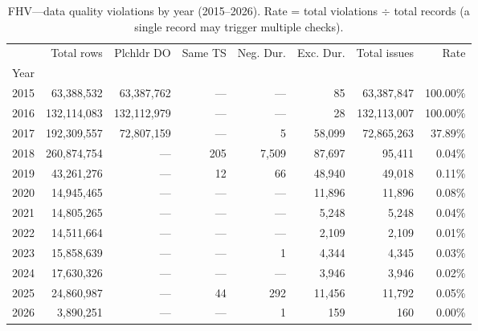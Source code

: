 \begin{table}
\caption{FHV---data quality violations by year (2015--2026). Rate = total violations $\div$ total records (a single record may trigger multiple checks).}
\label{tab:t2_fhv_tripdata}
\begin{tabular}{rrrrrrrr}
\toprule
 & Total rows & Plchldr DO & Same TS & Neg. Dur. & Exc. Dur. & Total issues & Rate \\
Year &  &  &  &  &  &  &  \\
\midrule
2015 & 63,388,532 & 63,387,762 & --- & --- & 85 & 63,387,847 & 100.00\% \\
2016 & 132,114,083 & 132,112,979 & --- & --- & 28 & 132,113,007 & 100.00\% \\
2017 & 192,309,557 & 72,807,159 & --- & 5 & 58,099 & 72,865,263 & 37.89\% \\
2018 & 260,874,754 & --- & 205 & 7,509 & 87,697 & 95,411 & 0.04\% \\
2019 & 43,261,276 & --- & 12 & 66 & 48,940 & 49,018 & 0.11\% \\
2020 & 14,945,465 & --- & --- & --- & 11,896 & 11,896 & 0.08\% \\
2021 & 14,805,265 & --- & --- & --- & 5,248 & 5,248 & 0.04\% \\
2022 & 14,511,664 & --- & --- & --- & 2,109 & 2,109 & 0.01\% \\
2023 & 15,858,639 & --- & --- & 1 & 4,344 & 4,345 & 0.03\% \\
2024 & 17,630,326 & --- & --- & --- & 3,946 & 3,946 & 0.02\% \\
2025 & 24,860,987 & --- & 44 & 292 & 11,456 & 11,792 & 0.05\% \\
2026 & 3,890,251 & --- & --- & 1 & 159 & 160 & 0.00\% \\
\bottomrule
\end{tabular}
\end{table}
